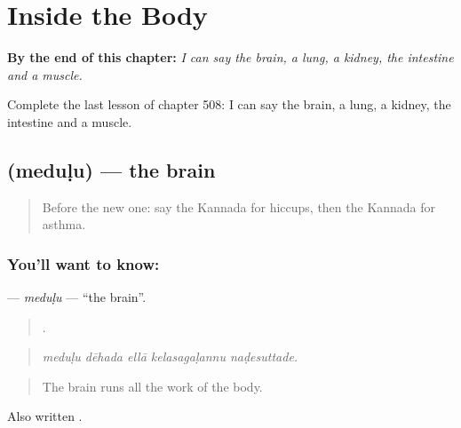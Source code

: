
\chapter{Inside the Body}
\label{ch:ka-inside-the-body}

\begin{chapteropening}
\textbf{By the end of this chapter:} \emph{I can say the brain, a lung, a kidney, the intestine and a muscle.}

Complete the last lesson of chapter 508: I can say the brain, a lung, a kidney, the intestine and a muscle.
\end{chapteropening}

\section[\texorpdfstring{\kn{ಮೆದುಳು} (meduḷu)}{ಮೆದುಳು (meduḷu)}]{ (meduḷu) — the brain}

\label{lesson:KA-C508-medulu}



\begin{quote}
Before the new one: say the Kannada for hiccups, then the Kannada for asthma.
\end{quote}

\subsection*{You'll want to know: }
\textbf{} — \emph{meduḷu} — \textquotedblleft{}the brain\textquotedblright{}.

\begin{quote}
    .
\end{quote}

\begin{quote}
\emph{meduḷu dēhada ellā kelasagaḷannu naḍesuttade.}
\end{quote}

\begin{quote}
The brain runs all the work of the body.
\end{quote}

Also written .

